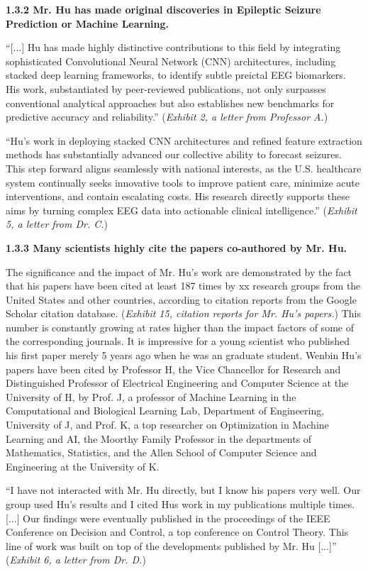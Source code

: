 \documentclass{article}
\begin{document}
{\bf 1.3.2 Mr. Hu has made original discoveries in Epileptic Seizure Prediction or Machine Learning. }

“[...] Hu has made highly distinctive contributions to this field by integrating sophisticated Convolutional Neural Network (CNN) architectures, including stacked deep learning frameworks, to identify subtle preictal EEG biomarkers. His work, substantiated by peer-reviewed publications, not only surpasses conventional analytical approaches but also establishes new benchmarks for predictive accuracy and reliability.” ({\it Exhibit 2, a letter from Professor A.}) 

“Hu’s work in deploying stacked CNN architectures and refined feature extraction methods has substantially advanced our collective ability to forecast seizures. This step forward aligns seamlessly with national interests, as the U.S. healthcare system continually seeks innovative tools to improve patient care, minimize acute interventions, and contain escalating costs. His research directly supports these aims by turning complex EEG data into actionable clinical intelligence.” ({\it Exhibit 5, a letter from Dr. C.}) 

{\bf 1.3.3 Many scientists highly cite the papers co-authored by Mr. Hu. }

The significance and the impact of Mr. Hu’s work are demonstrated by the fact that his papers have been cited at least 187 times by xx  research groups from the United States and other countries, according to citation reports from the Google Scholar citation database. ({\it Exhibit 15, citation reports for Mr. Hu’s papers.}) This number is constantly growing at rates higher than the impact factors of some of the corresponding journals. It is impressive for a young scientist who published his first paper merely 5 years ago when he was an graduate student. Wenbin Hu’s papers have been cited by Professor H, the Vice Chancellor for Research and Distinguished Professor of Electrical Engineering and Computer Science at the University of H, by Prof. J, a professor of Machine Learning in the Computational and Biological Learning Lab, Department of Engineering, University of J, and Prof. K, a top researcher on Optimization in Machine Learning and AI, the Moorthy Family Professor in the departments of Mathematics, Statistics, and the Allen School of Computer Science and Engineering at the University of K.

“I have not interacted with Mr. Hu directly, but I know his papers very well. Our group used Hu's results and I cited Hus work in my publications multiple times.  [...] Our findings were eventually published in the proceedings of the IEEE Conference on Decision and Control, a top conference on Control Theory. This line of work was built on top of the developments published by Mr. Hu [...]” ({\it Exhibit 6, a letter from Dr. D.})
\end{document}
